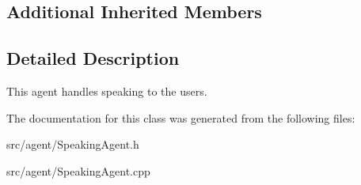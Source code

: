 \subsection*{Additional Inherited Members}


\subsection{Detailed Description}
This agent handles speaking to the users. 

The documentation for this class was generated from the following files\+:\begin{DoxyCompactItemize}
\item 
src/agent/Speaking\+Agent.\+h\item 
src/agent/Speaking\+Agent.\+cpp\end{DoxyCompactItemize}
